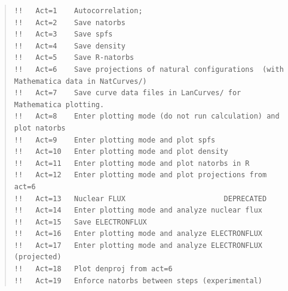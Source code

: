 \documentclass[10pt,leqno, oneside]{book}
\begin{document}
\begin{quote}
{\footnotesize
\begin{verbatim}
!!   Act=1    Autocorrelation; 
!!   Act=2    Save natorbs                                                                                                               
!!   Act=3    Save spfs                                                                                                                  
!!   Act=4    Save density                                                                                                               
!!   Act=5    Save R-natorbs                                                                                                             
!!   Act=6    Save projections of natural configurations  (with Mathematica data in NatCurves/)                                          
!!   Act=7    Save curve data files in LanCurves/ for Mathematica plotting.                                                                                                                                           
!!   Act=8    Enter plotting mode (do not run calculation) and plot natorbs                                                              
!!   Act=9    Enter plotting mode and plot spfs                                                                                          
!!   Act=10   Enter plotting mode and plot density                                                                                       
!!   Act=11   Enter plotting mode and plot natorbs in R                                                                                  
!!   Act=12   Enter plotting mode and plot projections from act=6                                                                        
!!   Act=13   Nuclear FLUX                       DEPRECATED                                                                                        
!!   Act=14   Enter plotting mode and analyze nuclear flux                                                                               
!!   Act=15   Save ELECTRONFLUX                                                                                                          
!!   Act=16   Enter plotting mode and analyze ELECTRONFLUX                                                                               
!!   Act=17   Enter plotting mode and analyze ELECTRONFLUX (projected)                                                                   
!!   Act=18   Plot denproj from act=6                                                                                                    
!!   Act=19   Enforce natorbs between steps (experimental)                                                                               

\end{verbatim}}
\end{quote}
\end{document}
